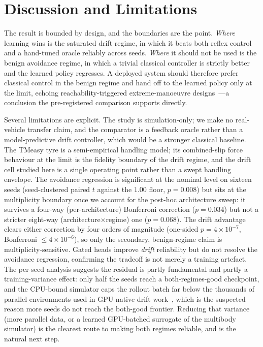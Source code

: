 \documentclass[11pt]{article}
\begin{document}
\FloatBarrier
\section{Discussion and Limitations}
The result is bounded by design, and the boundaries are the point. \emph{Where} learning wins is
the saturated drift regime, in which it beats both reflex control and a hand-tuned oracle reliably
across seeds. \emph{Where} it should not be used is the benign avoidance regime, in which a trivial
classical controller is strictly better and the learned policy regresses. A deployed system should
therefore prefer classical control in the benign regime and hand off to the learned policy only at
the limit, echoing reachability-triggered extreme-manoeuvre designs~\citep{zhao2024autonomous}---a
conclusion the pre-registered comparison supports directly.

Several limitations are explicit. The study is simulation-only; we make no real-vehicle transfer
claim, and the comparator is a feedback oracle rather than a model-predictive drift controller,
which would be a stronger classical baseline. The TMeasy tyre is a semi-empirical handling model;
its combined-slip force behaviour at the limit is the fidelity boundary of the drift regime, and the
drift cell studied here is a single operating point rather than a swept handling envelope. The
avoidance regression is significant at the nominal level on sixteen seeds (seed-clustered paired
$t$ against the $1.00$ floor, $p=0.008$) but sits at the multiplicity boundary once we account for the
post-hoc architecture sweep: it survives a four-way (per-architecture) Bonferroni correction
($p=0.034$) but not a stricter eight-way (architecture$\times$regime) one ($p=0.068$). The drift
advantage clears either correction by four orders of magnitude (one-sided $p=4\times10^{-7}$,
Bonferroni $\le 4\times10^{-6}$), so only the secondary, benign-regime claim is multiplicity-sensitive. Gated heads improve \emph{drift}
reliability but do not resolve the avoidance regression, confirming the tradeoff is not merely a
training artefact. The per-seed analysis suggests the residual is
partly fundamental and partly a training-variance effect: only half the seeds reach a
both-regimes-good checkpoint, and the CPU-bound simulator caps the rollout batch far below the
thousands of parallel environments used in GPU-native drift work~\citep{zhou2025learning,djeumou2024reference},
which is the suspected reason more seeds do not reach the both-good frontier. Reducing that variance
(more parallel data, or a learned GPU-batched surrogate of the multibody simulator) is the clearest
route to making both regimes reliable, and is the natural next step.
\end{document}

